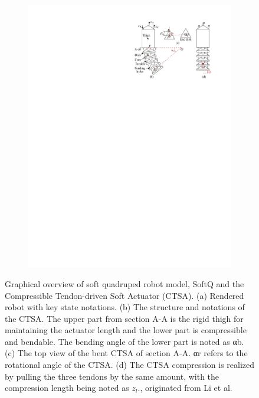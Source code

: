 \begin{figure}[ht]
\begin{subfigure}[b]{0.59\textwidth}
    \includegraphics[width=\linewidth]{img/chap3/legs.pdf}
    \end{subfigure}
    \caption{Graphical overview of soft quadruped robot model, SoftQ and the Compressible Tendon-driven Soft Actuator (CTSA). (a) Rendered robot with key state notations. (b) The structure and notations of the CTSA. The upper part from section A-A is the rigid thigh for maintaining the actuator length and the lower part is compressible and bendable. The bending angle of the lower part is noted as αb. (c) The top view of the bent CTSA of section A-A. αr refers to the rotational angle of the CTSA. (d) The CTSA compression is realized by pulling the three tendons by the same amount, with the compression length being noted as $z_l$., originated from Li et al.\cite{jiSynthesizingOptimalGait2022, jiOmnidirectionalWalkingQuadruped2022}}
    \label{fig:robot}
\end{figure}